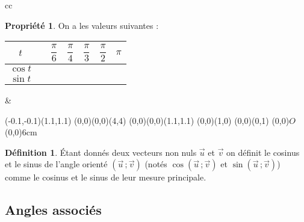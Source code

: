 \documentclass[a4paper,11pt]{article}
\theoremstyle{definition}
\newtheorem*{prop}{Propriété}
\newtheorem*{defi}{Définition}
\newcommand{\tnl}{\tabularnewline}
\newcommand{\vs}[1]{\vspace{#1}}
\newcommand{\vect}[1]{\overrightarrow{#1}}
\begin{document}
\vs{4cm}

\noindent\begin{tabularx}{\linewidth}{cc}

\begin{minipage}{11.5cm}

\begin{prop}
On a les valeurs suivantes : \medskip

\renewcommand{\arraystretch}{3}
\begin{tabular}{|c|>{\centering}p{0.9cm}|>{\centering}p{0.9cm}|>{\centering}p{0.9cm}|>{\centering}p{0.9cm}|>{\centering}p{0.9cm}|>{\centering}p{0.9cm}|}
\hline
$t$ & 0 & $\dfrac{\pi}6$ & $\dfrac{\pi}4$ & $\dfrac{\pi}3$ & $\dfrac{\pi}2$ & $ \pi$ \tnl \hline
$\cos t $ & & & & & & \tnl \hline
$\sin t $ & & & & & & \tnl \hline
\end{tabular}

\end{prop}

\end{minipage}
&
\begin{minipage}{6.3cm}

\begin{pspicture*}(-0.1,-0.1)(1.1,1.1)
\psgrid[subgriddiv=0,gridlabels=0,gridcolor=black,griddots=5,xunit=0.25,yunit=0.25](0,0)(0,0)(4,4)
\psaxes[subticks=1,labels=none,ticksize=0]{->}(0,0)(0,0)(1.1,1.1)
\psline{->}(0,0)(1,0)
\psline{->}(0,0)(0,1)
\uput[dl](0,0){$O$}
\pscircle(0,0){6cm}
\end{pspicture*}

\end{minipage}
\end{tabularx}

\vfill

\begin{defi} \'Etant donnés deux vecteurs non nuls $\vect u$ et $\vect v$ on définit le cosinus et le sinus de l'angle orienté $\left(\vect u \,;\vect v\right)$ (notés $\cos \left(\vect u \,;\vect v\right)$ et $\sin \left(\vect u \,;\vect v\right)$) comme le cosinus et le sinus de leur mesure principale.

\end{defi}

\newpage

\subsection{Angles associés}
\end{document}
